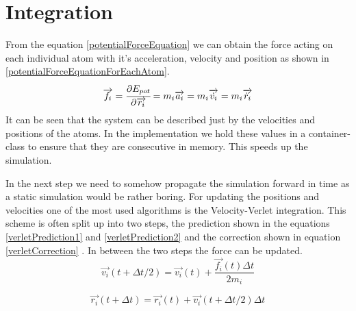 \section{Integration}
\begin{comment}
- obtain force from the previous equation
- dirivation in v. r.. from the mass
- system can be discribed just by the velocity and postion of each atom
- in the simulation the positions and velocities of the individual atoms have to be tracked and updated accordingly
- most used  is the Velocity-Verlet Algorithm
\end{comment}
From the equation \ref{potentialForceEquation} we can obtain the force acting on each individual atom with it's acceleration, velocity and position as shown in  \ref{potentialForceEquationForEachAtom}. 
\begin{equation}
	\label{potentialForceEquationForEachAtom}
	\overrightarrow{f_{i}} = \cfrac{\displaystyle\partial E_{pot}}{\displaystyle \partial \overrightarrow{r_{i}}} = m_{i}\overrightarrow{a_{i}} = m_{i}\overrightarrow{\dot{v_{i}}} = m_{i}\overrightarrow{\ddot{r_{i}}}
\end{equation}
It can be seen that the system can be described just by the velocities and positions of the atoms. 
In the implementation we hold these values in a container-class to ensure that they are consecutive in  memory. This speeds up the simulation. 
\par
In the next step we need to somehow propagate the simulation forward in time as a static simulation would be rather boring. For updating the positions and velocities one of the most used algorithms is the Velocity-Verlet integration. 
This scheme is often split up into two steps, the prediction shown in the equations \ref{verletPrediction1} and \ref{verletPrediction2} and the correction shown in equation \ref{verletCorrection} \cite[cf. ][]{molDymCourse}. In between the two steps the force can be updated. 
\begin{equation}
	\label{verletPrediction1}
	\overrightarrow{v_{i}}(t+\Delta t/2) = 
	\overrightarrow{v_{i}}(t) + 
	\frac{\overrightarrow{f_{i}}(t)\Delta t}{2m_{i}}
\end{equation}

\begin{equation}
	\label{verletPrediction2}
	\overrightarrow{r_{i}}(t+\Delta t) = 
	\overrightarrow{r_{i}}(t) + \overrightarrow{v_{i}}(t + \Delta t/2)\Delta t
\end{equation}

